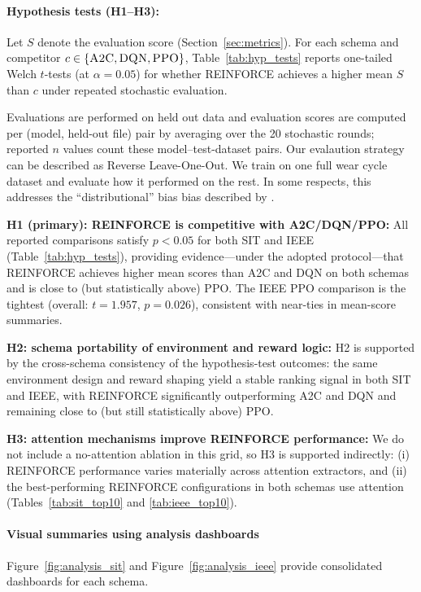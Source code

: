 \documentclass[sn-basic]{sn-jnl} %
\begin{document}
\paragraph{Hypothesis tests (H1--H3):}
Let $S$ denote the evaluation score (Section~\ref{sec:metrics}). For each schema and competitor $c\in\{\textsc{A2C},\textsc{DQN},\textsc{PPO}\}$, Table~\ref{tab:hyp_tests} reports one-tailed Welch $t$-tests (at $\alpha=0.05$) for whether \textsc{REINFORCE} achieves a higher mean $S$ than $c$ under repeated stochastic evaluation.

Evaluations are performed on held out data and evaluation scores are computed per (model, held-out file) pair by averaging over the 20 stochastic rounds; reported $n$ values count these model--test-dataset pairs. Our evalaution strategy can be described as Reverse Leave-One-Out. We train on one full wear cycle dataset and evaluate how it performed on the rest. In some respects, this addresses the ``distributional'' bias bias described by \cite{George2025Evaluation}.

\textbf{H1 (primary): \textsc{REINFORCE} is competitive with A2C/DQN/PPO:}
All reported comparisons satisfy $p<0.05$ for both SIT and IEEE (Table~\ref{tab:hyp_tests}), providing evidence---under the adopted protocol---that \textsc{REINFORCE} achieves higher mean scores than \textsc{A2C} and \textsc{DQN} on both schemas and is close to (but statistically above) \textsc{PPO}. The IEEE \textsc{PPO} comparison is the tightest (overall: $t=1.957$, $p=0.026$), consistent with near-ties in mean-score summaries.

\textbf{H2: schema portability of environment and reward logic:}
H2 is supported by the cross-schema consistency of the hypothesis-test outcomes: the same environment design and reward shaping yield a stable ranking signal in both SIT and IEEE, with \textsc{REINFORCE} significantly outperforming \textsc{A2C} and \textsc{DQN} and remaining close to (but still statistically above) \textsc{PPO}.

\textbf{H3: attention mechanisms improve \textsc{REINFORCE} performance:}
We do not include a no-attention ablation in this grid, so H3 is supported indirectly: (i) \textsc{REINFORCE} performance varies materially across attention extractors, and (ii) the best-performing \textsc{REINFORCE} configurations in both schemas use attention (Tables~\ref{tab:sit_top10} and \ref{tab:ieee_top10}).

\paragraph{Visual summaries using analysis dashboards}
Figure~\ref{fig:analysis_sit} and Figure~\ref{fig:analysis_ieee} provide consolidated dashboards for each schema.
\end{document}
